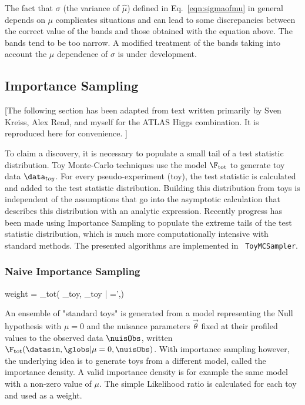 The fact that $\sigma$ (the variance of $\hat{\mu}$) defined in Eq.~\ref{eqn:sigmaofmu} in general depends on $\mu$ complicates situations and can lead to some discrepancies between the correct value of the bands and those obtained with the equation above.  The bands tend to be too narrow.  A modified treatment of the bands taking into account the $\mu$ dependence of $\sigma$ is under development.


\subsection{Importance Sampling}


[The following section has been adapted from text written primarily by Sven Kreiss, Alex Read, and myself for the ATLAS Higgs combination.  It is reproduced here for convenience. ]


To claim a discovery, it is necessary to populate a small tail of a test statistic distribution. Toy Monte-Carlo techniques use the model $\F_{\rm tot}$ to generate toy data $\data_{toy}$. For every pseudo-experiment (toy), the test statistic is calculated and added to the test statistic distribution. Building this distribution from toys is independent of the assumptions that go into the asymptotic calculation that describes this distribution with an analytic expression.   Recently progress has been made using Importance Sampling to populate the extreme tails of the test statistic distribution, which is much more computationally intensive with standard methods. The presented algorithms are implemented in \roostats\ \texttt{ToyMCSampler}.


\subsubsection{Naive Importance Sampling}



{\rm weight} =  {\F_{\rm tot}( \data_{\rm toy}, \globs_{\rm toy} | \mu=\mu',\nuisObs)}


An ensemble of "standard toys" is generated from a model representing the Null hypothesis with $\mu=0$ and the nuisance parameters $\vec\theta$ fixed at their profiled values to the observed data $\nuisObs$, written\\ \mbox{$\F_{\rm tot}(\datasim,\globs|\mu=0,\nuisObs)$}. With importance sampling however, the underlying idea is to generate toys from a different model, called the importance density. A valid importance density is for example the same model with a non-zero value of $\mu$. The simple Likelihood ratio is calculated for each toy and used as a weight.


